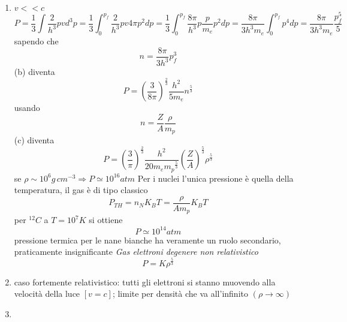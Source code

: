 \begin{enumerate}
    \item \(v<<c\)
    \begin{equation*}
        P = \frac{1}{3}\int \frac{2}{h^3}pv d^3p = \frac{1}{3}\int_0^{p_f}\frac{2}{h^3}pv 4\pi p^2dp = \frac{1}{3}\int_0^{p_f} \frac{8\pi}{h^3}p\frac{p}{m_e}p^2dp = \frac{8\pi}{3h^3m_e}\int_0^{p_f}p^4dp = \frac{8\pi}{3h^3m_e}\frac{p^5_f}{5} \tag{b}
    \end{equation*}
    sapendo che 
    \begin{equation*}
        n = \frac{8\pi}{3h^3}p^3_f 
    \end{equation*}
    (b) diventa
    \begin{equation*}
        P = {\left(\frac{3}{8\pi}\right)}^{\frac{2}{3}}\frac{h^2}{5m_e}n^{\frac{5}{3}} \tag{c}
    \end{equation*}
    usando 
    \begin{equation*}
        n= \frac{Z}{A}\frac{\rho}{m_p}
    \end{equation*}
    (c) diventa
    \begin{equation*}
        P = {\left(\frac{3}{\pi}\right)}^{\frac{2}{3}} \frac{h^2}{20m_e{m_p}^{\frac{5}{3}}}{\left(\frac{Z}{A}\right)}^{\frac{5}{3}}\rho^{\frac{5}{3}}
    \end{equation*}
    se \(\rho \sim 10^6 g \,  cm^{-3} \Rightarrow P \simeq 10^{16}atm\) \newline
    Per i nuclei l'unica pressione è quella della temperatura, il gas è di tipo classico
    \begin{equation*}
        P_{TH} = n_N K_B T = \frac{\rho}{Am_p}K_BT
    \end{equation*}
    per \(^{12}C\) a \(T = 10^7K\) si ottiene
    \begin{equation*}
        P \simeq 10^{14} atm 
    \end{equation*}
    pressione termica per le nane bianche ha veramente un ruolo secondario, praticamente insignificante \newline
    \textit{Gas elettroni degenere non relativistico}
    \begin{equation*}
        P = K\rho^{\frac{5}{3}}
    \end{equation*}
    \item caso fortemente relativistico: tutti gli elettroni si stanno muovendo alla velocità della luce \([v = c]\); limite per densità che va all'infinito \((\rho \to \infty)\)
    \item \begin{equation*}

\end{equation*}
\end{enumerate}
